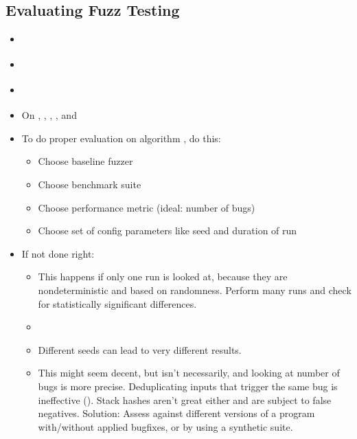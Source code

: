 \documentclass{article}
\begin{document}
\subsection{Evaluating Fuzz Testing}
\begin{itemize}
    \item \cite{EvaluatingFuzzTesting}
    \item {}\cite{EvaluatingFuzzTesting}
    \item {}\cite{EvaluatingFuzzTesting}
    \item On , , , , and 
    \item To do proper evaluation on algorithm , do this:
          \begin{itemize}
              \item Choose baseline fuzzer 
              \item Choose benchmark suite
              \item Choose performance metric (ideal: number of bugs)
              \item Choose set of config parameters like seed and duration of run
          \end{itemize}
    \item If not done right:
          \begin{itemize}
              \item {}\cite{EvaluatingFuzzTesting} This happens if only one run is looked at, because they are nondeterministic and based on randomness. Perform many runs and check for statistically significant differences.
              \item {}\cite{EvaluatingFuzzTesting}
              \item Different seeds can lead to very different results.
              \item {}\cite{EvaluatingFuzzTesting} This might seem decent, but isn't necessarily, and looking at number of bugs is more precise. Deduplicating inputs that trigger the same bug is ineffective (\cite{EvaluatingFuzzTesting}). Stack hashes aren't great either and are subject to false negatives. Solution: Assess against different versions of a program with/without applied bugfixes, or by using a synthetic suite.

\end{itemize}
\end{itemize}
\end{document}
